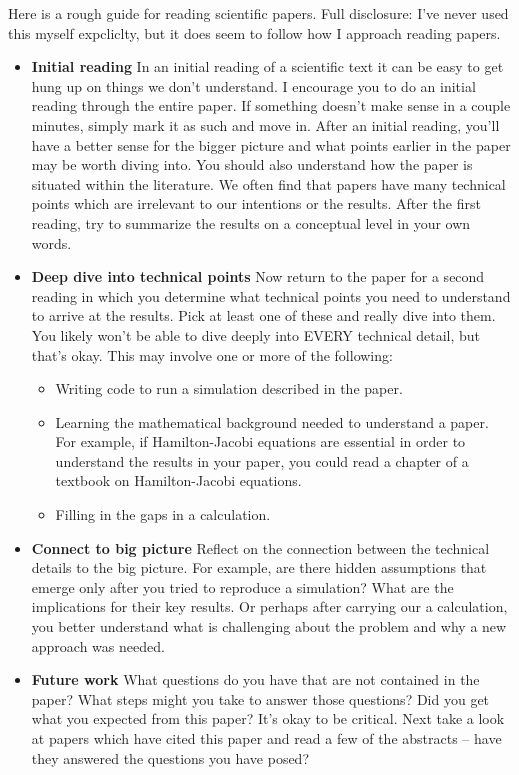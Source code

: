 \documentclass{amsart}
\begin{document}
Here is a rough guide for reading scientific papers. Full disclosure: I've never used this myself expcliclty, but it does seem to follow how I approach reading papers.

\begin{itemize}
\item {\bf Initial reading} In an initial reading of a scientific text it can be easy to get hung up on things we don't understand. I encourage you to do an initial reading through the entire paper. If something doesn't make sense in a couple minutes, simply mark it as such and move in. After an initial reading, you'll have a better sense for the bigger picture and what points earlier in the paper may be worth diving into. You should also understand how the paper is situated within the literature. We often find that papers have many technical points which are irrelevant to our intentions or the results.
After the first reading, try to summarize the results on a conceptual level in your own words.
\item{\bf Deep dive into technical points} Now return to the paper for a second reading in which you determine what technical points you need to understand to arrive at the results. Pick at least one of these and really dive into them. You likely won't be able to dive deeply into EVERY technical detail, but that's okay. This may involve one or more of the following:
\begin{itemize}
\item  Writing code to run a simulation described in the paper.  
\item  Learning the mathematical background needed to understand a paper. For example, if Hamilton-Jacobi equations are essential in order to understand the results in your paper, you could read a chapter of a textbook on Hamilton-Jacobi equations.   \item Filling in the gaps in a calculation.
\end{itemize}
\item  {\bf Connect to big picture} Reflect on the connection between the technical details to the big picture. For example, are there hidden assumptions that emerge only after you tried to reproduce a simulation? What are the implications for their key results. Or perhaps after carrying our a calculation, you better understand what is challenging about the problem and why a new approach was needed.
\item  {\bf Future work}  What questions do you have that are not contained in the paper?  What steps might you take to answer those questions? Did you get what you expected from this paper? It's okay to be critical. Next take a look at papers which have cited this paper and read a few of the abstracts -- have they answered the questions you have posed?
\end{itemize}
\end{document}
